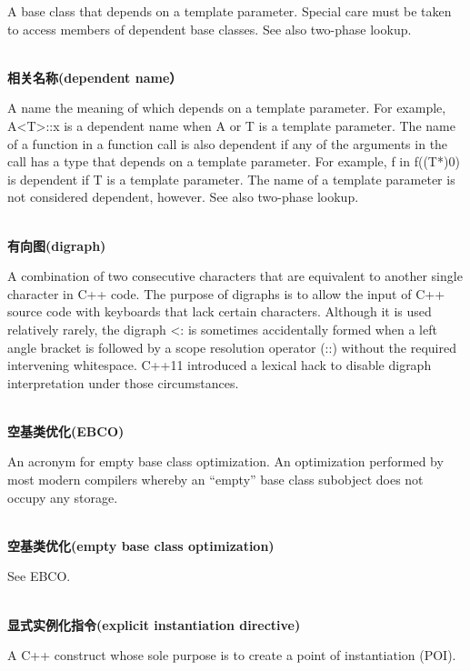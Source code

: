 A base class that depends on a template parameter. Special care must be taken to access members of dependent base classes. See also two-phase lookup.

\hspace*{\fill} \\ %
\noindent
\textbf{相关名称(dependent name）}

A name the meaning of which depends on a template parameter. For example, A<T>::x is a dependent name when A or T is a template parameter. The name of a function in a function call is also dependent if any of the arguments in the call has a type that depends on a template parameter. For example, f in f((T*)0) is dependent if T is a template parameter. The name of a template parameter is not considered dependent, however. See also two-phase lookup.

\hspace*{\fill} \\ %
\noindent
\textbf{有向图(digraph)}

A combination of two consecutive characters that are equivalent to another single character in C++ code. The purpose of digraphs is to allow the input of C++ source code with keyboards that lack certain characters. Although it is used relatively rarely, the digraph <: is sometimes accidentally formed when a left angle bracket is followed by a scope resolution operator (::) without the required intervening whitespace. C++11 introduced a lexical hack to disable digraph interpretation under those circumstances.

\hspace*{\fill} \\ %
\noindent
\textbf{空基类优化(EBCO)}

An acronym for empty base class optimization. An optimization performed by most modern compilers whereby an “empty” base class subobject does not occupy any storage.

\hspace*{\fill} \\ %
\noindent
\textbf{空基类优化(empty base class optimization)}

See EBCO.

\hspace*{\fill} \\ %
\noindent
\textbf{显式实例化指令(explicit instantiation directive)}

A C++ construct whose sole purpose is to create a point of instantiation (POI).

